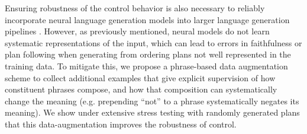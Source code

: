 Ensuring robustness of the control behavior is also necessary to reliably incorporate 
neural language generation models
into larger language generation pipelines \citep{moryossef2019a,moryossef2019b,castroferreira2019}.
 However, as previously mentioned, neural models do not learn systematic 
representations
of the input, which can lead to errors in faithfulness or plan following
when generating from ordering plans not well represented in the training 
data. To mitigate this, 
we propose a phrase-based data augmentation scheme to collect 
additional examples that give explicit supervision of how constituent
phrases compose, and how that composition can systematically change the 
meaning (e.g. prepending ``not'' to a phrase systematically negates its
meaning). We show under extensive stress testing with randomly generated
plans that this data-augmentation improves the robustness of control.


%



%
 

